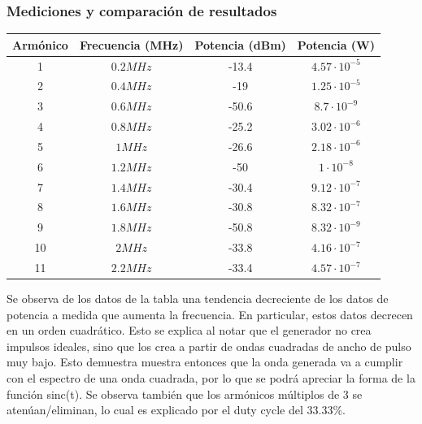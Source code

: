 \documentclass[../../labo_tp5_main.tex]{subfiles}
\begin{document}
\subsubsection{Mediciones y comparación de resultados}
\begin{table}[H] %
	\centering
 		\begin{tabular}{||c c c c||} 
 			\hline
			Armónico & Frecuencia (MHz) & Potencia (dBm) & Potencia (W)\\ [0.5ex] 
 			\hline\hline
			1 & $0.2MHz$ & -13.4 & $4.57\cdot 10^{-5}$\\
			2 & $0.4MHz$ & -19 & $1.25\cdot 10^{-5}$\\
			3 & $0.6MHz$ & -50.6 & $8.7\cdot 10^{-9}$\\
			4 & $0.8MHz$ & -25.2 & $3.02\cdot 10^{-6}$\\
			5 & $1MHz$ & -26.6 & $2.18\cdot 10^{-6}$\\
			6 & $1.2MHz$ & -50 & $1\cdot 10^{-8}$\\
			7 & $1.4MHz$ & -30.4 & $9.12\cdot 10^{-7}$\\
			8 & $1.6MHz$ & -30.8 & $8.32\cdot 10^{-7}$\\
			9 & $1.8MHz$ & -50.8 & $8.32\cdot 10^{-9}$\\
			10 & $2MHz$ & -33.8 & $4.16\cdot 10^{-7}$\\
			11 & $2.2MHz$ & -33.4 & $4.57\cdot 10^{-7}$\\[1ex] 
			\hline
		\end{tabular}
\end{table}
Se observa de los datos de la tabla una tendencia decreciente de los datos de potencia a medida que aumenta la frecuencia. En particular, estos datos decrecen en un orden cuadrático. Esto se explica al notar que el generador no crea impulsos ideales, sino que los crea a partir de ondas cuadradas de ancho de pulso muy bajo. Esto demuestra muestra entonces que la onda generada va a cumplir con el espectro de una onda cuadrada, por lo que se podrá apreciar la forma de la función sinc(t). Se observa también que los armónicos múltiplos de 3 se atenúan/eliminan, lo cual es explicado por el duty cycle del 33.33\%.
\end{document}
